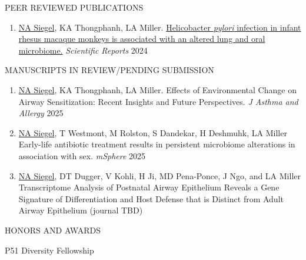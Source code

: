 \documentclass{resume} %
\begin{document}

\begin{rSection}{PEER REVIEWED PUBLICATIONS}
\begin{enumerate}

\item \underline{NA Siegel}, KA Thongphanh, LA Miller. \href{https://pubmed.ncbi.nlm.nih.gov/38693196/}{Helicobacter \textit{pylori} infection in infant rhesus macaque monkeys is associated with an altered lung and oral microbiome.} \emph{Scientific Reports} 2024

\end{enumerate}
\end{rSection}

\begin{rSection}{MANUSCRIPTS IN REVIEW/PENDING SUBMISSION}
\begin{enumerate}

\item \underline{NA Siegel}, KA Thongphanh, LA Miller. Effects of Environmental Change on Airway Sensitization: Recent Insights and Future Perspectives. \emph{J Asthma and Allergy} 2025

\item  \underline{NA Siegel}, T Westmont, M Rolston, S Dandekar, H Deshmuhk, LA Miller Early-life antibiotic treatment results in persistent microbiome alterations in association with sex. \emph{mSphere} 2025

\item  \underline{NA Siegel}, DT Dugger, V Kohli, H Ji, MD Pena-Ponce, J Ngo, and LA Miller Transcriptome Analysis of Postnatal Airway Epithelium Reveals a Gene Signature of Differentiation and Host Defense that is Distinct from Adult Airway Epithelium (journal TBD)

\end{enumerate}
\end{rSection}



\begin{rSection}{HONORS AND AWARDS}
\item P51 Diversity Fellowship  
\end{rSection}
\end{document}
